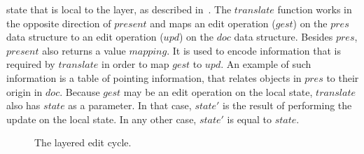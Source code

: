       state that is local to the layer, as described in~\cite{architecture}. The $translate$ function works in the
      opposite direction of $present$ and maps an edit operation ($gest$) on the
      $pres$ data structure to an edit operation ($upd$) on the $doc$ data structure.
      Besides $pres$, $present$ also returns a value $mapping$. It is used to encode
      information that is required by $translate$ in order to map $gest$ to $upd$. An
      example of such information is a table of pointing information, that relates
      objects in $pres$ to their origin in $doc$. Because $gest$ may be an edit
      operation on the local state, $translate$ also has $state$ as a parameter. In
      that case, $state'$ is the result of performing the update on the local state.
      In any other case, $state'$ is equal to $state$. 
\begin{figure}
\begin{small}
\begin{center}
\begin{center}
\begin{scriptsize}
\bigskip \noindent
{}
\end{scriptsize}
\end{center}\caption{The layered edit cycle.}\label{simplelayers} 
\end{center}
\end{small}
\end{figure}

